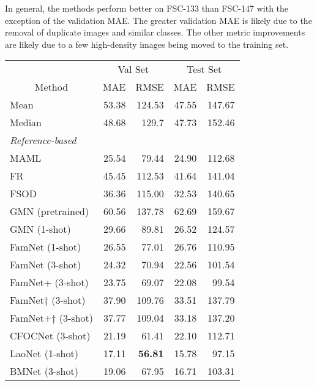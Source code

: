 \documentclass[letterpaper, 11pt]{IEEEtran}
\begin{document}
In general, the methods perform better on FSC-133 than FSC-147 with the exception of the validation MAE. The greater validation MAE is likely due to the removal of duplicate images and similar classes. The other metric improvements are likely due to a few high-density images being moved to the training set.
\begin{table}
    \centering
    \fontsize{9}{9}\selectfont
    
\begin{tabular}{lrrrr}
 \toprule
 & \multicolumn{2}{c}{Val Set} & \multicolumn{2}{c}{Test Set} \\
\multicolumn{1}{c}{Method} & \multicolumn{1}{c}{MAE} & \multicolumn{1}{c}{RMSE} & \multicolumn{1}{c}{MAE} & \multicolumn{1}{c}{RMSE} \\

\midrule
Mean & 53.38 & 124.53 & 47.55 & 147.67 \\
Median & 48.68 & 129.7 & 47.73 & 152.46 \\
\midrule
\textit{Reference-based} & & & & \\
MAML 
\cite{finn2017model}
& 25.54 & 79.44 & 24.90 & 112.68 \\
FR 
\cite{kang2019few}
& 45.45 & 112.53 & 41.64 & 141.04 \\
FSOD 
\cite{fan2020few}
& 36.36 & 115.00 & 32.53 & 140.65 \\
GMN (pretrained) 
\cite{Lu18}
& 60.56 & 137.78 & 62.69 & 159.67 \\
GMN 
 \cite{Lu18} \hfill (1-shot) 
& 29.66 & 89.81 & 26.52 & 124.57 \\
FamNet 
 \cite{ranjan2021Famnet} \hfill (1-shot) 
& 26.55 & 77.01 & 26.76 & 110.95 \\
FamNet 
 \cite{ranjan2021Famnet} \hfill (3-shot) 
& 24.32 & 70.94 & 22.56 & 101.54 \\
FamNet+ 
 \cite{ranjan2021Famnet} \hfill (3-shot) 
& 23.75 & 69.07 & 22.08 & 99.54 \\
FamNet$\dag$  \cite{ranjan2021Famnet} \hfill (3-shot) & 37.90 &  109.76 & 33.51  & 137.79  \\
FamNet+$\dag$  \cite{ranjan2021Famnet} \hfill (3-shot) & 37.77 & 109.04 &  33.18 & 137.20
 \\
CFOCNet \cite{yang2021cfoc}
\hfill (3-shot) 
& 21.19 & 61.41 & 22.10 & 112.71  \\
LaoNet \cite{lin2021object}
\hfill (1-shot) 
& 17.11 & \textbf{56.81} & 15.78 & 97.15 \\
BMNet 
  \cite{shi2022represent} \hfill (3-shot) 
& 19.06 & 67.95 & 16.71 & 103.31  \\

\end{tabular}
\end{table}
\end{document}
